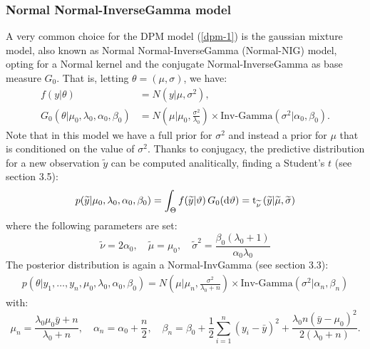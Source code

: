 \subsubsection{Normal Normal-InverseGamma model} \label{nnig}
A very common choice for the DPM model (\ref{dpm-1}) is the gaussian mixture model, also known as Normal Normal-InverseGamma (Normal-NIG) model, opting for a Normal kernel and the conjugate Normal-InverseGamma as base measure $G_0$. That is, letting $\theta=(\mu,\sigma)$, we have:
\begin{equation}
	\begin{aligned}
		f(y|\theta)&=N(y| \mu ,\sigma^2),  \\
		G_0(\theta|\mu_0,\lambda_0, \alpha_0, 	\beta_0)
		&=N\left(\mu | \mu_0 ,\frac{\sigma^2} {\lambda_0}\right) \times \text{Inv-Gamma}(\sigma^2|\alpha_0, \beta_0 ).
	\end{aligned}
\end{equation}
Note that in this model we have a full prior for $\sigma^2$ and instead a prior for $\mu$ that is conditioned on the value of $\sigma^2$.
Thanks to conjugacy, the predictive distribution for a new observation $\widetilde{y}$ can be computed analitically, finding a Student's $t$ (see \cite{integral} section 3.5):
\begin{align*}
	p(\widetilde{y}|\mu_0,\lambda_0, \alpha_0, \beta_0) =
	\int_\Theta f(\widetilde{y}|\vartheta) \, G_0(\mathrm d\vartheta) =
	\text{t}_{\widetilde \nu}\left(\widetilde{y}|\widetilde{\mu},\widetilde{\sigma}\right)
\end{align*}
where the following parameters are set:
$$
	\widetilde{\nu}=2 \alpha_0, \quad
	\widetilde{\mu}=\mu_0, \quad
	\widetilde{\sigma}^2= \frac{\beta_0(\lambda_0+1)}{\alpha_0 \lambda_0}
$$
The posterior distribution is again a Normal-InvGamma (see \cite{integral} section 3.3):
\begin{align*}
	p(\theta|y_1,\dots,y_n,\mu_0,\lambda_0, \alpha_0, \beta_0)=N\left(\mu | \mu_n ,\frac{\sigma^2} {\lambda_0 + n}\right) \times \text{Inv-Gamma}(\sigma^2|\alpha_n, \beta_n )
\end{align*}
with:
$$
\mu_n=\frac{\lambda_0 \mu_0 \bar{y} + n}{\lambda_0 + n}, \quad \alpha_n= \alpha_0 + \frac{n}{2}, \quad \beta_n= \beta_0 + \frac{1}{2}\sum_{i=1}^{n} (y_i-\bar{y})^2 + \frac{\lambda_0 n(\bar{y}-\mu_0)^2}{2(\lambda_0 + n)}.
$$
